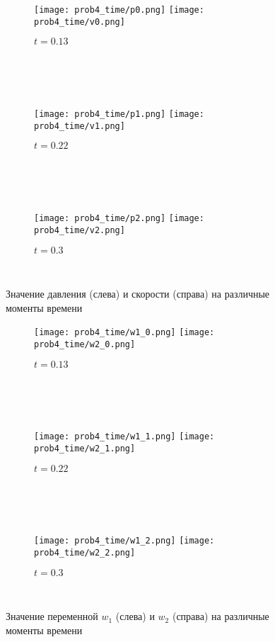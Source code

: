 \begin{figure}[h!]
\begin{subfigure}{1.0\linewidth}\centering
\texttt{[image: prob4\_time/p0.png]}
\texttt{[image: prob4\_time/v0.png]}
\caption{$t = 0.13$}\label{fig:prob4_pv_a}
\end{subfigure} \\
\hfill \\
\hfill \\
\begin{subfigure}{1.0\linewidth}\centering
\texttt{[image: prob4\_time/p1.png]}
\texttt{[image: prob4\_time/v1.png]}
\caption{$t = 0.22$}\label{fig:prob4_pv_b}
\end{subfigure}\\
\hfill \\
\hfill \\
\begin{subfigure}{1.0\linewidth}\centering
\texttt{[image: prob4\_time/p2.png]}
\texttt{[image: prob4\_time/v2.png]}
\caption{$t=0.3$}\label{fig:prob4_pv_c}
\end{subfigure}\\
\caption{Значение давления (слева) и скорости (справа) на различные моменты времени}\label{fig:prob4_pv}
\end{figure}

\begin{figure}[h!]
\begin{subfigure}{1.0\linewidth}\centering
\texttt{[image: prob4\_time/w1\_0.png]}
\texttt{[image: prob4\_time/w2\_0.png]}
\caption{$t = 0.13$}\label{fig:prob4_w12_a}
\end{subfigure} \\
\hfill \\
\hfill \\
\begin{subfigure}{1.0\linewidth}\centering
\texttt{[image: prob4\_time/w1\_1.png]}
\texttt{[image: prob4\_time/w2\_1.png]}
\caption{$t = 0.22$}\label{fig:prob4_w12_b}
\end{subfigure}\\
\hfill \\
\hfill \\
\begin{subfigure}{1.0\linewidth}\centering
\texttt{[image: prob4\_time/w1\_2.png]}
\texttt{[image: prob4\_time/w2\_2.png]}
\caption{$t=0.3$}\label{fig:prob4_w12_c}
\end{subfigure}\\
\caption{Значение переменной $w_1$ (слева) и $w_2$ (справа) на различные моменты времени}\label{fig:prob4_w12}
\end{figure}

